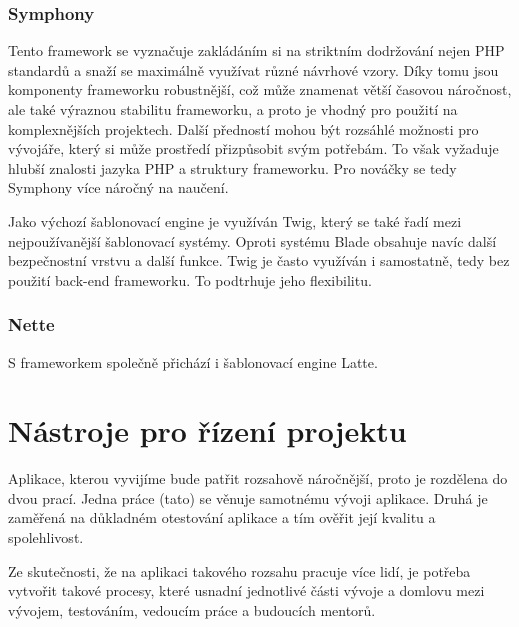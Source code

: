 \documentclass[czech,BP]{thesiskiv}
\begin{document}
\subsubsection{Symphony}
\par Tento framework se vyznačuje zakládáním si na striktním dodržování nejen PHP standardů a snaží se maximálně využívat různé návrhové vzory. Díky tomu jsou komponenty frameworku robustnější, což může znamenat větší časovou náročnost, ale také výraznou stabilitu frameworku, a proto je vhodný pro použití na komplexnějších projektech. Další předností mohou být rozsáhlé možnosti pro vývojáře, který si může prostředí přizpůsobit svým potřebám. To však vyžaduje hlubší znalosti jazyka PHP a struktury frameworku. Pro nováčky se tedy Symphony více náročný na naučení.
\par Jako výchozí šablonovací engine je využíván Twig, který se také řadí mezi nejpoužívanější šablonovací systémy. Oproti systému Blade obsahuje navíc další bezpečnostní vrstvu a další funkce. Twig je často využíván i samostatně, tedy bez použití back-end frameworku. To podtrhuje jeho flexibilitu.
\subsubsection{Nette}
\par 
\par S frameworkem společně přichází i šablonovací engine Latte.

\section{Nástroje pro řízení projektu}
\par Aplikace, kterou vyvijíme bude patřit rozsahově náročnější, proto je rozdělena do dvou prací. Jedna práce (tato) se věnuje samotnému vývoji aplikace. Druhá je zaměřená na důkladném otestování aplikace a tím ověřit její kvalitu a spolehlivost.
\par Ze skutečnosti, že na aplikaci takového rozsahu pracuje více lidí, je potřeba vytvořit takové procesy, které usnadní jednotlivé části vývoje a domlovu mezi vývojem, testováním, vedoucím práce a budoucích mentorů.
\end{document}

